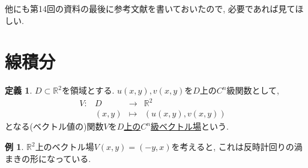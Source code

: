 \documentclass[dvipdfmx,a4paper,11pt]{article}
\newcommand{\R}{\mathbb{R}}
\theoremstyle{definition}
\newtheorem{dfn}[thm]{定義}
\newtheorem{exa}[thm]{例}
\begin{document}
他にも第14回の資料の最後に参考文献を書いておいたので, 必要であれば見てほしい.

\section{線積分}


 \begin{tcolorbox}[
    colback = white,
    colframe = green!35!black,
    fonttitle = \bfseries,
    breakable = true]
    \begin{dfn}
    
  $D \subset \R^2$を領域とする.
  $u(x,y), v(x,y)$を$D$上の$C^n$級関数として, 
 $$
\begin{array}{ccccc}
V: &D & \rightarrow & \R^2 & \\
&(x,y) & \longmapsto & (u(x,y), v(x,y))&
\end{array}
$$
となる(ベクトル値の)関数$V$を\underline{$D$上の$C^n$級ベクトル場}という. 

 \end{dfn}
 \end{tcolorbox}
 
 \begin{exa}
 $\R^2$上のベクトル場$V(x,y)=(-y,x)$を考えると, これは反時計回りの渦まきの形になっている.
 \end{exa}
 
\end{document}
